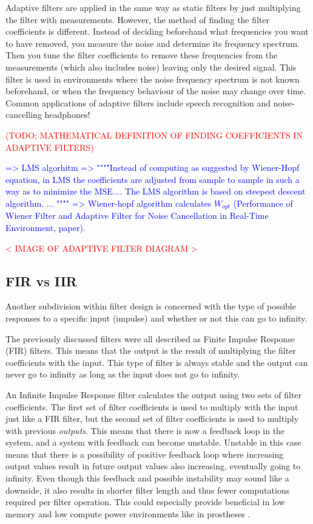 Adaptive filters are applied in the same way as static filters by just multiplying the filter with measurements. However, the  method of finding the filter coefficients is different. Instead of deciding beforehand what frequencies you want to have removed, you measure the noise and determine its frequency spectrum. Then you tune the filter coefficients to remove these frequencies from the measurements (which also includes noise) leaving only the desired signal. This filter is used in environments where the noise frequency spectrum is not known beforehand, or when the frequency behaviour of the noise may change over time. Common applications of adaptive filters include speech recognition and noise-cancelling headphones! \cite{wiener_vs_adaptive_realtime_noisecancellation}

\textcolor{red}{(TODO: MATHEMATICAL DEFINITION OF FINDING COEFFICIENTS IN ADAPTIVE FILTERS) }

\textcolor{blue}{
=> LMS algorhitm
=> """"Instead of computing as suggested by
Wiener-Hopf equation, in LMS the coefficients are adjusted
from sample to sample in such a way as to minimize the MSE.... The LMS algorithm is based on steepest descent algorithm. ... """" => Wiener-hopf algorithm calculates $W_{opt}$ (Performance of Wiener Filter and Adaptive Filter for Noise Cancellation in Real-Time Environment, paper).}

\textcolor{red}{< IMAGE OF ADAPTIVE FILTER DIAGRAM >}

\subsection{FIR vs IIR}
Another subdivision within filter design is concerned with the type of possible responses to a specific input (impulse) and whether or not this can go to infinity.

The previously discussed filters were all described as Finite Impulse Response (FIR) filters. This means that the output is the result of multiplying the filter coefficients with the input. This type of filter is always stable and the output can never go to infinity as long as the input does not go to infinity.

An Infinite Impulse Response filter calculates the output using two sets of filter coefficients. The first set of filter coefficients is used to multiply with the input just like a FIR filter, but the second set of filter coefficients is used to multiply with previous \textit{outputs}. This means that there is now a feedback loop in the system, and a system with feedback can become unstable. Unstable in this case means that there is a possibility of positive feedback loop where increasing output values result in future output values also increasing, eventually going to infinity. Even though this feedback and possible instability may sound like a downside, it also results in shorter filter length and thus fewer computations required per filter operation. This could especially provide beneficial in low memory and low compute power environments like in prostheses \cite{fir_vs_iir}.

